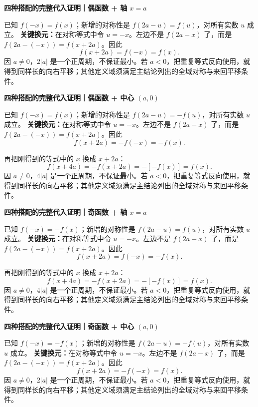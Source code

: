 \clearpage
\begin{proofbox}
\textbf{四种搭配的完整代入证明｜偶函数 + 轴 $x=a$}


已知 $f(-x)=f(x)$；新增的对称性是 $f(2a-u)=f(u)$，对所有实数 $u$ 成立。
\textbf{关键换元：}在对称等式中令 $u=-x$。左边不是 $f(2a-x)$ 了，而是 $f(2a-(-x))=f(x+2a)$。因此
\[f(x+2a)=f(-x)=f(x).\]
因 $a\ne0$，$2|a|$ 是一个正周期，不保证最小。若 $a<0$，把重复等式反向使用，就得到同样长的向右平移；其他定义域须满足主结论列出的全域对称与来回平移条件。
\end{proofbox}
\clearpage
\begin{proofbox}
\textbf{四种搭配的完整代入证明｜偶函数 + 中心 $(a,0)$}


已知 $f(-x)=f(x)$；新增的对称性是 $f(2a-u)=-f(u)$，对所有实数 $u$ 成立。
\textbf{关键换元：}在对称等式中令 $u=-x$。左边不是 $f(2a-x)$ 了，而是 $f(2a-(-x))=f(x+2a)$。因此
\[f(x+2a)=-f(-x)=-f(x).\]

再把刚得到的等式中的 $x$ 换成 $x+2a$：
\[f(x+4a)=-f(x+2a)=-[-f(x)]=f(x).\]
因 $a\ne0$，$4|a|$ 是一个正周期，不保证最小。若 $a<0$，把重复等式反向使用，就得到同样长的向右平移；其他定义域须满足主结论列出的全域对称与来回平移条件。
\end{proofbox}
\clearpage
\begin{proofbox}
\textbf{四种搭配的完整代入证明｜奇函数 + 轴 $x=a$}


已知 $f(-x)=-f(x)$；新增的对称性是 $f(2a-u)=f(u)$，对所有实数 $u$ 成立。
\textbf{关键换元：}在对称等式中令 $u=-x$。左边不是 $f(2a-x)$ 了，而是 $f(2a-(-x))=f(x+2a)$。因此
\[f(x+2a)=f(-x)=-f(x).\]

再把刚得到的等式中的 $x$ 换成 $x+2a$：
\[f(x+4a)=-f(x+2a)=-[-f(x)]=f(x).\]
因 $a\ne0$，$4|a|$ 是一个正周期，不保证最小。若 $a<0$，把重复等式反向使用，就得到同样长的向右平移；其他定义域须满足主结论列出的全域对称与来回平移条件。
\end{proofbox}
\clearpage
\begin{proofbox}
\textbf{四种搭配的完整代入证明｜奇函数 + 中心 $(a,0)$}


已知 $f(-x)=-f(x)$；新增的对称性是 $f(2a-u)=-f(u)$，对所有实数 $u$ 成立。
\textbf{关键换元：}在对称等式中令 $u=-x$。左边不是 $f(2a-x)$ 了，而是 $f(2a-(-x))=f(x+2a)$。因此
\[f(x+2a)=-f(-x)=f(x).\]
因 $a\ne0$，$2|a|$ 是一个正周期，不保证最小。若 $a<0$，把重复等式反向使用，就得到同样长的向右平移；其他定义域须满足主结论列出的全域对称与来回平移条件。
\end{proofbox}
